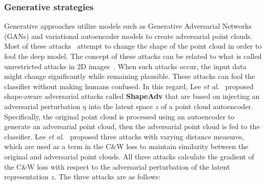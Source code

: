 \documentclass{ieeeaccess}
\def\etal{\textit{et al.}}
\begin{document}
\subsubsection{Generative strategies}
\label{subsubsec:generative-based}

Generative approaches utilize models such as Generative Adversarial Networks (GANs) and variational autoencoder models to create adversarial point clouds. Most of these attacks~\cite{zhou2020lg,lee2020shapeadv,tang2023deep,dai2021generating} attempt to change the shape of the point cloud in order to fool the deep model. The concept of these attacks can be related to what is called unrestricted attacks in 2D images~\cite{brown2018unrestricted,naderi2021generating,song2018constructing}. When such attacks occur, the input data might change significantly while remaining plausible. %
These attacks can fool the classifier without making humans confused. In this regard, Lee \etal~\cite{lee2020shapeadv} proposed shape-aware adversarial attacks called \textbf{ShapeAdv} that are based on injecting an adversarial perturbation $\eta$ into the latent space $z$ of a point cloud autoencoder. Specifically, the original point cloud is processed using an autoencoder to generate an adversarial point cloud, then the adversarial point cloud is fed to the classifier. Lee \etal~\cite{lee2020shapeadv} proposed three attacks with varying distance measures, which are used as a term in the C\&W loss to maintain similarity between the original and adversarial point clouds. All three attacks calculate the gradient of the C\&W loss with respect to the adversarial perturbation of the latent representation $z$. The three attacks are as follows: 
\end{document}
